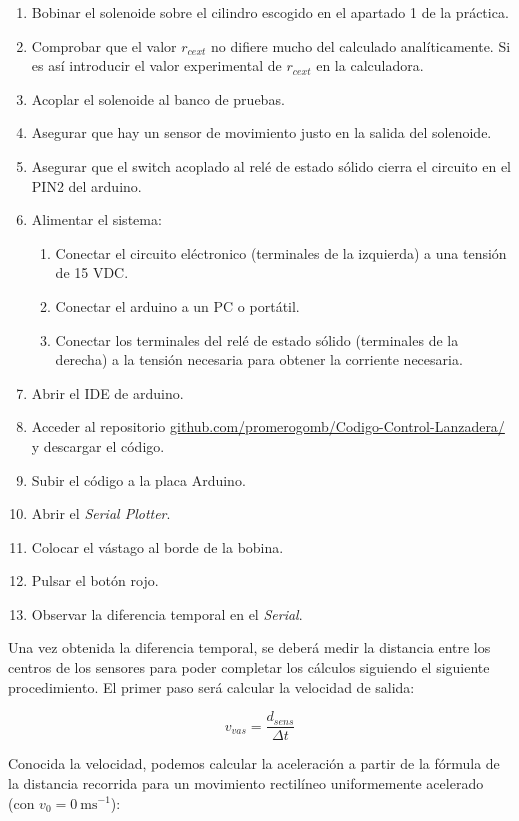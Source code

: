 \begin{enumerate}
    \item Bobinar el solenoide sobre el cilindro escogido en el apartado 1 de la práctica.
    \item Comprobar que el valor \(r_{cext}\) no difiere mucho del calculado analíticamente. Si es así introducir el valor experimental de \(r_{cext}\) en la calculadora.
    \item Acoplar el solenoide al banco de pruebas.
    \item Asegurar que hay un sensor de movimiento justo en la salida del solenoide.
    \item Asegurar que el switch acoplado al relé de estado sólido cierra el circuito en el PIN2 del arduino.
    \item Alimentar el sistema:
    \begin{enumerate}
        \item Conectar el circuito eléctronico (terminales de la izquierda) a una tensión de 15 VDC.
        \item Conectar el arduino a un PC o portátil.
        \item Conectar los terminales del relé de estado sólido (terminales de la derecha) a la tensión necesaria para obtener la corriente necesaria.
    \end{enumerate}
    \item Abrir el IDE de arduino.
    \item Acceder al repositorio \href{URL}{github.com/promerogomb/Codigo-Control-Lanzadera/} y descargar el código.
    \item Subir el código a la placa Arduino.
    \item Abrir el \textit{Serial Plotter}.
    \item Colocar el vástago al borde de la bobina.
    \item Pulsar el botón rojo.
    \item Observar la diferencia temporal en el \textit{Serial}.
\end{enumerate}

Una vez obtenida la diferencia temporal, se deberá medir la distancia entre los centros de los sensores para poder completar los cálculos siguiendo el siguiente procedimiento. El primer paso será calcular la velocidad de salida:

\[v_{vas}=\frac{d_{sens}}{\Delta t}\]

Conocida la velocidad, podemos calcular la aceleración a partir de la fórmula de la distancia recorrida para un movimiento rectilíneo uniformemente acelerado (con \(v_0 = 0~\text{ms}^{-1}\)):

